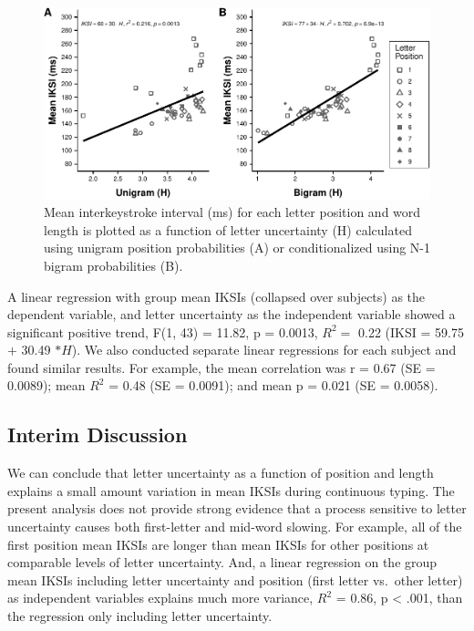 \documentclass[,man,floatsintext]{apa6}
\begin{document}
\begin{figure}
\centering
\includegraphics{v2-manuscript_files/figure-latex/figure4-1.pdf}
\caption{\label{fig:figure4}Mean interkeystroke interval (ms) for each letter position and word length is plotted as a function of letter uncertainty (H) calculated using unigram position probabilities (A) or conditionalized using N-1 bigram probabilities (B).}
\end{figure}



A linear regression with group mean IKSIs (collapsed over subjects) as the dependent variable, and letter uncertainty as the independent variable showed a significant positive trend, F(1, 43) = 11.82, p = 0.0013, \(R^2 =\) 0.22 (IKSI = 59.75 \(+\) 30.49 \(* H\)). We also conducted separate linear regressions for each subject and found similar results. For example, the mean correlation was r = 0.67 (SE = 0.0089); mean \(R^2\) = 0.48 (SE = 0.0091); and mean p = 0.021 (SE = 0.0058).

\hypertarget{interim-discussion}{%
\subsection{Interim Discussion}\label{interim-discussion}}

We can conclude that letter uncertainty as a function of position and length explains a small amount variation in mean IKSIs during continuous typing. The present analysis does not provide strong evidence that a process sensitive to letter uncertainty causes both first-letter and mid-word slowing. For example, all of the first position mean IKSIs are longer than mean IKSIs for other positions at comparable levels of letter uncertainty. And, a linear regression on the group mean IKSIs including letter uncertainty and position (first letter vs.~other letter) as independent variables explains much more variance, \(R^2\) = 0.86, p \textless{} .001, than the regression only including letter uncertainty.
\end{document}
